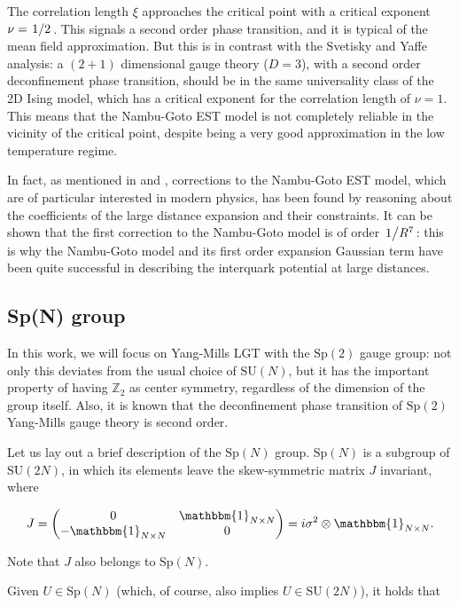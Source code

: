\documentclass[reqno,12pt]{article}
\numberwithin{equation}{section}
\newcommand{\SU}{\mathrm{SU}}
\newcommand{\Sp}{\mathrm{Sp}}
\newcommand{\id}{\mathbbm{1}}
\begin{document}
The correlation length $\xi$ approaches the critical point with a critical exponent $\nu = \flatfrac{1}{2}$. This signals
a second order phase transition, and it is typical of the mean field approximation. But this is in contrast with the
Svetisky and Yaffe analysis: a $(2+1)$ dimensional gauge theory ($D=3$), with a second order
deconfinement phase transition, should be in the same universality class of the 2D Ising model, which has a critical
exponent for the correlation length of $\nu = 1$. This means that the Nambu-Goto EST model is not completely reliable
in the vicinity of the critical point, despite being a very good approximation in the low temperature regime. 

In fact, as mentioned in \cite{caselle} and \cite{caristo}, corrections to the Nambu-Goto EST model, which are of
particular interested in modern physics, has been found by reasoning about the coefficients of the large distance expansion
and their constraints. It can be shown that the first correction to the Nambu-Goto model is of order $\flatfrac{1}{R^7}$: this
is why the Nambu-Goto model and its first order expansion Gaussian term have been quite successful in describing the
interquark potential at large distances.   

\subsection{Sp(N) group} \label{sp2}

In this work, we will focus on Yang-Mills LGT with the $\Sp(2)$ gauge group: not only this deviates from the usual choice of $\SU(N)$, but
it has the important property of having $\mathbb{Z}_2$ as center symmetry, regardless of the dimension of the group itself. Also,
it is known that the deconfinement phase transition of $\Sp(2)$ Yang-Mills gauge theory is second order. 

Let us lay out a brief description of the $\Sp(N)$ group. $\Sp(N)$ is a subgroup of $\SU(2N)$, in which its elements leave the skew-symmetric
matrix $J$ invariant, where

\begin{equation}
	J = \mqty(0 & \id_{N \times N} \\ -\id_{N \times N} & 0) = i\sigma^2 \otimes \id_{N \times N}.
\end{equation}

Note that $J$ also belongs to $\Sp(N)$.

Given $U \in \Sp(N)$ (which, of course, also implies $U \in \SU(2N)$), it holds that
\end{document}
